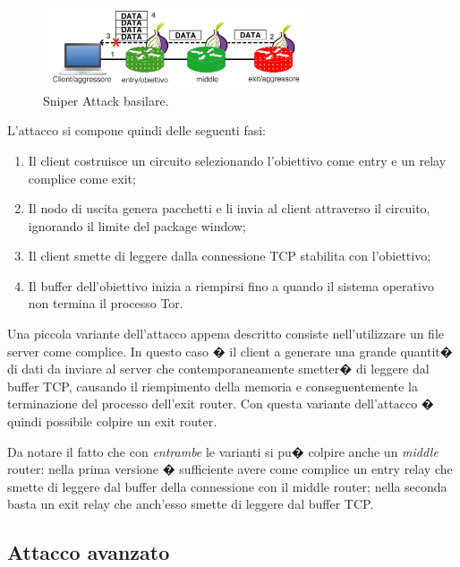 \begin{figure}[!htbp]
\centering
\includegraphics[width=0.7\textwidth]{./figure//attaccobase}
\caption{Sniper Attack basilare.}
\label{FIG:BaseAttack}
\end{figure}

L'attacco si compone quindi delle seguenti fasi:
\begin{enumerate}
\item Il client costruisce un circuito selezionando l'obiettivo come entry e un relay complice come exit;
\item Il nodo di uscita genera pacchetti e li invia al client attraverso il circuito, ignorando il limite del package window;
\item Il client smette di leggere dalla connessione TCP stabilita con l'obiettivo;
\item Il buffer dell'obiettivo inizia a riempirsi fino a quando il sistema operativo non termina il processo Tor.
\end{enumerate}
Una piccola variante dell'attacco appena descritto consiste nell'utilizzare un file server come complice. In questo caso � il client a generare una grande quantit� di dati da inviare al server che contemporaneamente smetter� di leggere dal buffer TCP, causando il riempimento della memoria e conseguentemente la terminazione del processo dell'exit router. Con questa variante dell'attacco � quindi possibile colpire un exit router.


Da notare il fatto che con \emph{entrambe} le varianti si pu� colpire anche un \emph{middle} router: nella prima versione � sufficiente avere come complice un entry relay che smette di leggere dal buffer della connessione con il middle router; nella seconda basta un exit relay che anch'esso smette di leggere dal buffer TCP.

\subsection{Attacco avanzato}

